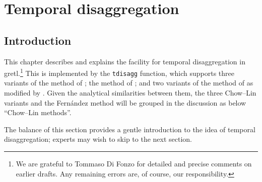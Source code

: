 \chapter{Temporal disaggregation}
\label{chap:tdisagg}

\newcommand{\Yb}{\mathbf{Y}}
\newcommand{\Xb}{\mathbf{X}}
\newcommand{\CXb}{\mathbf{CX}}
\newcommand{\Cb}{\mathbf{C}}
\newcommand{\Vb}{\mathbf{V}}
\newcommand{\Db}{\mathbf{D}}

\section{Introduction}
\label{sec:tdisagg-intro}

This chapter describes and explains the facility for temporal
disaggregation in gretl.\footnote{We are grateful to Tommaso Di Fonzo
for detailed and precise comments on earlier drafts. Any remaining
errors are, of course, our responsibility.} This is implemented by the
\texttt{tdisagg} function, which supports three variants of the method
of \cite{chowlin71}; the method of \cite{fernandez81}; and two
variants of the method of \cite{denton71} as modified by
\cite{cholette84}. Given the analytical similarities between them, the
three Chow--Lin variants and the Fern\'andez method will be grouped in
the discussion as below ``Chow--Lin methods''.

The balance of this section provides a gentle introduction to the idea
of temporal disaggregation; experts may wish to skip to the next
section.

